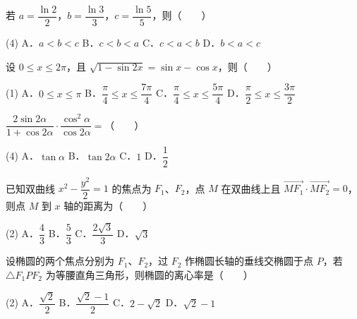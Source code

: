\begin{question}
若 $a = \dfrac{\ln 2}{2}$，$b = \dfrac{\ln 3}{3}$，$c = \dfrac{\ln 5}{5}$，则\mbox{（　　）}

\begin{gkopts}(4)
\task A．$a < b < c$
\task B．$c < b < a$
\task C．$c < a < b$
\task D．$b < a < c$
\end{gkopts}

\end{question}
\begin{question}
设 $0 \leqslant x \leqslant 2\pi$，且 $\sqrt{1 - \sin 2x} = \sin x - \cos x$，则\mbox{（　　）}

\begin{gkopts}(1)
\task A．$0 \leqslant x \leqslant \pi$
\task B．$\dfrac{\pi}{4} \leqslant x \leqslant \dfrac{7\pi}{4}$
\task C．$\dfrac{\pi}{4} \leqslant x \leqslant \dfrac{5\pi}{4}$
\task D．$\dfrac{\pi}{2} \leqslant x \leqslant \dfrac{3\pi}{2}$
\end{gkopts}

\end{question}
\begin{question}
$\dfrac{2\sin 2\alpha}{1 + \cos 2\alpha} \cdot \dfrac{\cos^2 \alpha}{\cos 2\alpha} =$\mbox{（　　）}

\begin{gkopts}(4)
\task A．$\tan \alpha$
\task B．$\tan 2\alpha$
\task C．$1$
\task D．$\dfrac{1}{2}$
\end{gkopts}

\end{question}
\begin{question}
已知双曲线 $x^2 - \dfrac{y^2}{2} = 1$ 的焦点为 $F_1$、$F_2$，点 $M$ 在双曲线上且 $\overrightarrow{MF_1} \cdot \overrightarrow{MF_2} = 0$，则点 $M$ 到 $x$ 轴的距离为\mbox{（　　）}

\begin{gkopts}(2)
\task A．$\dfrac{4}{3}$
\task B．$\dfrac{5}{3}$
\task C．$\dfrac{2\sqrt{3}}{3}$
\task D．$\sqrt{3}$
\end{gkopts}

\end{question}
\begin{question}
设椭圆的两个焦点分别为 $F_1$、$F_2$，过 $F_2$ 作椭圆长轴的垂线交椭圆于点 $P$，若 $\triangle F_1PF_2$ 为等腰直角三角形，则椭圆的离心率是\mbox{（　　）}

\begin{gkopts}(2)
\task A．$\dfrac{\sqrt{2}}{2}$
\task B．$\dfrac{\sqrt{2} - 1}{2}$
\task C．$2 - \sqrt{2}$
\task D．$\sqrt{2} - 1$
\end{gkopts}

\end{question}

